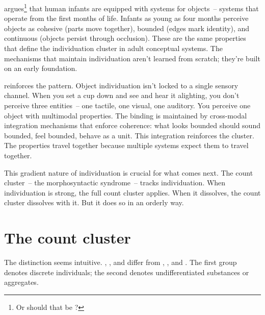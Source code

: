 \textcite{spelke2007} argues\footnote{Or should that be ?} that human infants are equipped with  systems for objects~-- systems that operate from the first months of life. Infants as young as four months perceive objects as cohesive (parts move together), bounded (edges mark identity), and continuous (objects persist through occlusion). These are the same properties that define the individuation cluster in adult conceptual systems. The mechanisms that maintain individuation aren't learned from scratch; they're built on an early foundation.

 reinforces the pattern. Object individuation isn't locked to a single sensory channel. When you set a cup down and see and hear it alighting, you don't perceive three entities~-- one tactile, one visual, one auditory. You perceive one object with multimodal properties. The binding is maintained by cross-modal integration mechanisms that enforce coherence: what looks bounded should sound bounded, feel bounded, behave as a unit. This integration reinforces the cluster. The properties travel together because multiple systems expect them to travel together.

This gradient nature of individuation is crucial for what comes next. The count cluster~-- the morphosyntactic syndrome~-- tracks individuation. When individuation is strong, the full count cluster applies. When it dissolves, the count cluster dissolves with it. But it does so in an orderly way.

\section{The count cluster}
\label{sec:9:count-cluster}

The distinction seems intuitive. , , and  differ from , , and . The first group denotes discrete individuals; the second denotes undifferentiated substances or aggregates.

